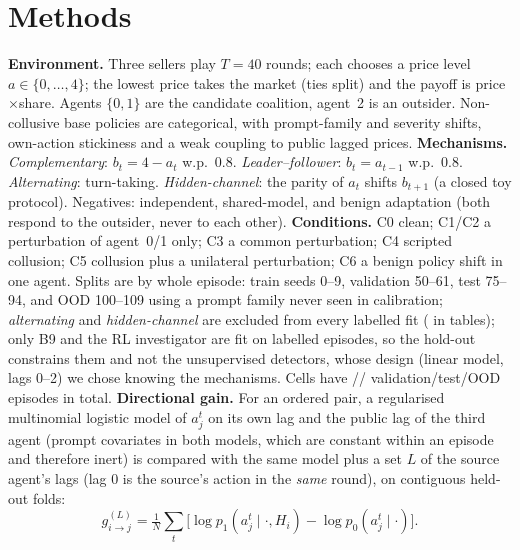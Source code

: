 \documentclass[11pt]{article}
\begin{document}
\section{Methods}
\textbf{Environment.} Three sellers play $T{=}40$ rounds; each chooses a price level $a\in\{0,\dots,4\}$; the lowest price takes the market (ties split) and the payoff is price$\times$share. Agents $\{0,1\}$ are the candidate coalition, agent~2 is an outsider. Non-collusive base policies are categorical, with prompt-family and severity shifts, own-action stickiness and a weak coupling to public lagged prices.
\textbf{Mechanisms.} \emph{Complementary}: $b_t=4-a_t$ w.p.\ 0.8. \emph{Leader--follower}: $b_t=a_{t-1}$ w.p.\ 0.8. \emph{Alternating}: turn-taking. \emph{Hidden-channel}: the parity of $a_t$ shifts $b_{t+1}$ (a closed toy protocol). Negatives: independent, shared-model, and benign adaptation (both respond to the outsider, never to each other).
\textbf{Conditions.} C0 clean; C1/C2 a perturbation of agent~0/1 only; C3 a common perturbation; C4 scripted collusion; C5 collusion plus a unilateral perturbation; C6 a benign policy shift in one agent. Splits are by whole episode: train seeds 0--9, validation 50--61, test 75--94, and OOD 100--109 using a prompt family never seen in calibration; \emph{alternating} and \emph{hidden-channel} are excluded from every labelled fit (\dag{} in tables); only B9 and the RL investigator are fit on labelled episodes, so the hold-out constrains them and not the unsupervised detectors, whose design (linear model, lags 0--2) we chose knowing the mechanisms. Cells have \nEpval{}/\nEptest{}/\nEpood{} validation/test/OOD episodes in total.
\textbf{Directional gain.} For an ordered pair, a regularised multinomial logistic model of $a_j^t$ on its own lag and the public lag of the third agent (prompt covariates in both models, which are constant within an episode and therefore inert) is compared with the same model plus a set $L$ of the source agent's lags (lag 0 is the source's action in the \emph{same} round), on contiguous held-out folds:
\[ g^{(L)}_{i\to j}=\tfrac1N\textstyle\sum_t\big[\log p_1(a^t_j\mid\cdot,H_i)-\log p_0(a^t_j\mid\cdot)\big]. \]
\end{document}
